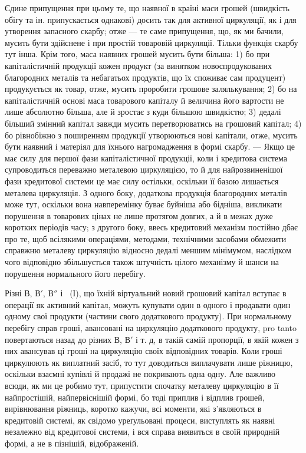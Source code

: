 Єдине припущення при цьому те, що наявної в країні маси грошей
(швидкість обігу та ін. припускається однакові) досить так для активної
циркуляції, як і для утворення запасного скарбу; отже — те саме припущення,
що, як ми бачили, мусить бути здійснене і при простій товаровій
циркуляції. Тільки функція скарбу тут інша. Крім того, маса наявних
грошей мусить бути більша: 1) бо при капіталістичній продукції
кожен продукт (за винятком новоспродукованих благородних металів та
небагатьох продуктів, що їх споживає сам продуцент) продукується як
товар, отже, мусить проробити грошове залялькування; 2) бо на капіталістичній
основі маса товарового капіталу й величина його вартости не
лише абсолютно більша, але й зростає з куди більшою швидкістю;
3) дедалі більший змінний капітал завжди мусить перетворюватись на
грошовий капітал; 4) бо рівнобіжно з поширенням продукції утворюються
нові капітали, отже, мусить бути наявний і матеріял для їхнього нагромадження
в формі скарбу. — Якщо це має силу для першої фази капіталістичної
продукції, коли і кредитова система супроводиться переважно
металевою циркуляцією, то й для найрозвиненішої фази кредитової
системи це має силу остільки, оскільки її базою лишається металева
циркуляція. З одного боку, додаткова продукція благородних металів
може тут, оскільки вона навперемінку буває буйніша або бідніша,
викликати порушення в товарових цінах не лише протягом довгих, а й
в межах дуже коротких періодів часу; з другого боку, ввесь кредитовий
механізм постійно дбає про те, щоб всілякими операціями, методами,
технічними засобами обмежити справжню металеву циркуляцію відносно
дедалі меншим мінімумом, наслідком чого відповідно збільшується також
штучність цілого механізму й шанси на порушення нормального його
перебігу.

Різні $В$, $В'$, $В''$ і~ (І), що їхній віртуальний новий грошовий
капітал вступає в операції як активний капітал, можуть купувати один в одного
і продавати один одному свої продукти (частини свого додаткового
продукту). При нормальному перебігу справ гроші, авансовані на циркуляцію
додаткового продукту, pro tanto повертаються назад до різних
$В$, $В'$ і т. д, в такій самій пропорції, в якій кожен з них авансував
ці гроші на циркуляцію своїх відповідних товарів. Коли гроші циркулюють
як виплатний засіб, то тут доводиться виплачувати лише ріжницю,
оскільки взаємні купівлі й продажі не покривають одна одну. Але важливо
всюди, як ми це робимо тут, припустити спочатку металеву циркуляцію
в її найпростішій, найпервіснішій формі, бо тоді приплив
і відплив грошей, вирівнювання ріжниць, коротко кажучи, всі моменти,
які з’являються в кредитовій системі, як свідомо уреґульовані
процеси, виступлять як наявні незалежно від кредитової системи, і
вся справа виявиться в своїй природній формі, а не в пізнішій,
відображеній.

